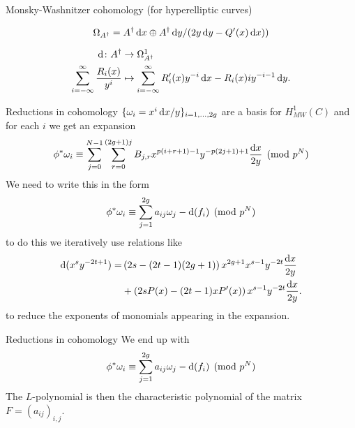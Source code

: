 \begin{frame}{Monsky-Washnitzer cohomology (for hyperelliptic curves)}

    \[ \Omega _{A^\dagger} = A^\dagger \mathop{}\!\mathrm{d} x \oplus A^\dagger \mathop{}\!\mathrm{d} y/(2y\mathop{}\!\mathrm{d} y - Q'(x)\mathop{}\!\mathrm{d} x))\]


    \begin{align*}
        \mathop{}\!\mathrm{d} \colon A^\dagger &\to \Omega^1_{A^\dagger}\\ \sum_{i=-\infty}^\infty \frac{R_i(x)}{y^i} &\mapsto \sum_{i=-\infty}^\infty R'_i(x) y^{-i}\mathop{}\!\mathrm{d} x-R_i(x) iy^{-i-1} \mathop{}\!\mathrm{d} y\text{.}\label{eqn-exterior-d}
    \end{align*}

\end{frame}

\begin{frame}{Reductions in cohomology}
    \(\{\omega_i  = x^i\mathop{}\!\mathrm{d} x/y\}_{i=1,\ldots, 2g}\) are a basis for $H^1_{MW}(C)$ and for each $i$
    we get an expansion
    \[\phi^* \omega_i \equiv\sum_{j=0}^{N-1} \sum_{r=0}^{(2g+1)j} B_{j,r} x^{p(i+r+1) - 1}y^{-p(2j+1) + 1} \frac{\mathop{}\!\mathrm{d} x}{2y}\pmod{p^N}\]\pause
    We need to write this in the form
    \[\phi^* \omega_i \equiv \sum_{j=1}^{2g} a_{ij} \omega_j  - \mathop{}\!\mathrm{d}(f_i)\pmod{p^N}\]\pause
    to do this we iteratively use relations like
    \begin{align*}
        \mathop{}\!\mathrm{d}(x^s y^{-2t + 1}) = &\left(2s - (2t - 1 ) (2g+1)  \right)x^{2g+1} x^{s-1} y^{-2t}\frac{\mathop{}\!\mathrm{d} x}{2y} \\
    &+ \left(2sP(x) - (2t - 1 )xP'(x) \right) x^{s-1} y^{-2t}\frac{\mathop{}\!\mathrm{d} x}{2y}\text{.}\end{align*}
    to reduce the exponents of monomials appearing in the expansion.
\end{frame}

\begin{frame}{Reductions in cohomology}
    We  end up with
    \[\phi^* \omega_i \equiv \sum_{j=1}^{2g} a_{ij} \omega_j  - \mathop{}\!\mathrm{d}(f_i)\pmod{p^N}\]\pause
    The $L$-polynomial is then the characteristic polynomial of the matrix $F = (a_{ij})_{i,j}$.
\end{frame}

